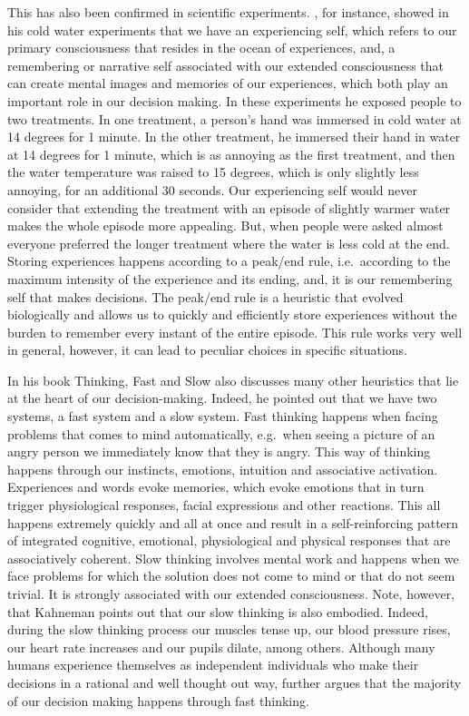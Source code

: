 \documentclass[
  11pt,
]{book}
\begin{document}
This has also been confirmed in scientific experiments. \citet{Kahneman2012}, for instance, showed in his cold water experiments that we have an experiencing self, which refers to our primary consciousness that resides in the ocean of experiences, and, a remembering or narrative self associated with our extended consciousness that can create mental images and memories of our experiences, which both play an important role in our decision making. In these experiments he exposed people to two treatments. In one treatment, a person's hand was immersed in cold water at 14 degrees for 1 minute. In the other treatment, he immersed their hand in water at 14 degrees for 1 minute, which is as annoying as the first treatment, and then the water temperature was raised to 15 degrees, which is only slightly less annoying, for an additional 30 seconds. Our experiencing self would never consider that extending the treatment with an episode of slightly warmer water makes the whole episode more appealing. But, when people were asked almost everyone preferred the longer treatment where the water is less cold at the end. Storing experiences happens according to a peak/end rule, i.e.~according to the maximum intensity of the experience and its ending, and, it is our remembering self that makes decisions. The peak/end rule is a heuristic that evolved biologically and allows us to quickly and efficiently store experiences without the burden to remember every instant of the entire episode. This rule works very well in general, however, it can lead to peculiar choices in specific situations.

In his book Thinking, Fast and Slow \citet{Kahneman2012} also discusses many other heuristics that lie at the heart of our decision-making. Indeed, he pointed out that we have two systems, a fast system and a slow system. Fast thinking happens when facing problems that comes to mind automatically, e.g.~when seeing a picture of an angry person we immediately know that they is angry. This way of thinking happens through our instincts, emotions, intuition and associative activation. Experiences and words evoke memories, which evoke emotions that in turn trigger physiological responses, facial expressions and other reactions. This all happens extremely quickly and all at once and result in a self-reinforcing pattern of integrated cognitive, emotional, physiological and physical responses that are associatively coherent. Slow thinking involves mental work and happens when we face problems for which the solution does not come to mind or that do not seem trivial. It is strongly associated with our extended consciousness. Note, however, that Kahneman points out that our slow thinking is also embodied. Indeed, during the slow thinking process our muscles tense up, our blood pressure rises, our heart rate increases and our pupils dilate, among others. Although many humans experience themselves as independent individuals who make their decisions in a rational and well thought out way, \citet{Kahneman2012} further argues that the majority of our decision making happens through fast thinking.
\end{document}
